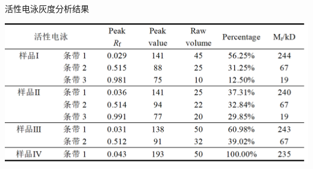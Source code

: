 \begin{table}[H]
    \centering
    \caption{活性电泳灰度分析结果}
    \includegraphics{figure/electro_analysis/act-1.png}
    \label{fig:acti}
\end{table}

